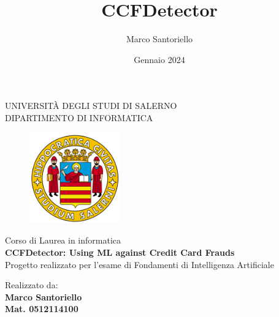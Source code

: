 \documentclass[]{article}
\title{CCFDetector}
\author{Marco Santoriello}
\date{Gennaio 2024}
\begin{document}
\begin{titlepage}
    \begin{center}
        \LARGE{\uppercase{Università degli Studi di Salerno}}\\
        \vspace{5mm}
    	\uppercase{\normalsize Dipartimento di Informatica}\\
    \end{center}
    \begin{figure}[H]
        \centering
        \includegraphics[width=0.35\textwidth]{img/logo_unisa.png}
    \end{figure}

    \begin{center}
    	\normalsize{ Corso di Laurea in informatica }\\
    	\vspace{15mm}
        {\LARGE{\bf CCFDetector: Using ML against Credit Card Frauds }}\\
        {\large{ Progetto realizzato per l'esame di Fondamenti di Intelligenza Artificiale}}\\
    	\vspace{10mm}
    \end{center}
    \begin{minipage}[t]{0.4\textwidth}\raggedright
    	{\large{Realizzato da: \\ \bf Marco Santoriello\\ Mat. 0512114100}}
    \end{minipage}

    \vspace{90mm}

\end{titlepage}

\setcounter{tocdepth}{3} %

\tableofcontents
\newpage
\end{document}
